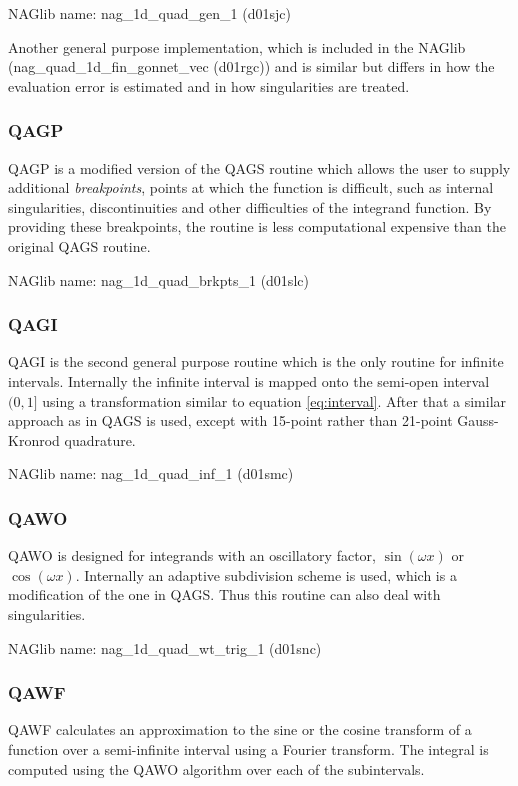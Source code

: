 NAGlib name: nag\_1d\_quad\_gen\_1 (d01sjc) \cite{nag_d01sjc}

Another general purpose implementation, which is included in the NAGlib (nag\_quad\_1d\_fin\_gonnet\_vec (d01rgc)) and is similar but differs in how the evaluation error is estimated and in how singularities are treated. \cite{nag_d01rgc}



\subsubsection{QAGP}
QAGP is a modified version of the QAGS routine which allows the user to supply additional \emph{breakpoints}, points at which the function is difficult, such as internal singularities, discontinuities and other difficulties of the integrand function. By providing these breakpoints, the routine is less computational expensive than the original QAGS routine. \cite{quadpack, GSL_Reference, nag_d01slc}

NAGlib name: nag\_1d\_quad\_brkpts\_1 (d01slc) \cite{nag_d01slc}



\subsubsection{QAGI}
QAGI is the second general purpose routine which is the only routine for infinite intervals. Internally the infinite interval is mapped onto the semi-open interval $(0,1]$ using a transformation similar to equation \ref{eq:interval}. After that a similar approach as in QAGS is used, except with 15-point rather than 21-point Gauss-Kronrod quadrature. \cite{quadpack, GSL_Reference, nag_d01smc}

NAGlib name: nag\_1d\_quad\_inf\_1 (d01smc) \cite{nag_d01smc}


\subsubsection{QAWO} QAWO is designed for integrands with an oscillatory 
factor, $\sin(\omega x)$ or $\cos(\omega x)$. Internally an adaptive 
subdivision scheme is used, which is a modification of the one in QAGS. Thus 
this routine can also deal with singularities. \cite{GSL_Reference, quadpack, 
nag_d01snc}

NAGlib name: nag\_1d\_quad\_wt\_trig\_1 (d01snc) \cite{nag_d01snc}



\subsubsection{QAWF}
QAWF calculates an approximation to the sine or the cosine transform of a function over a semi-infinite interval using a Fourier transform. The integral is computed using the QAWO algorithm over each of the subintervals.\cite{GSL_Reference, quadpack, nag_d01ssc}

